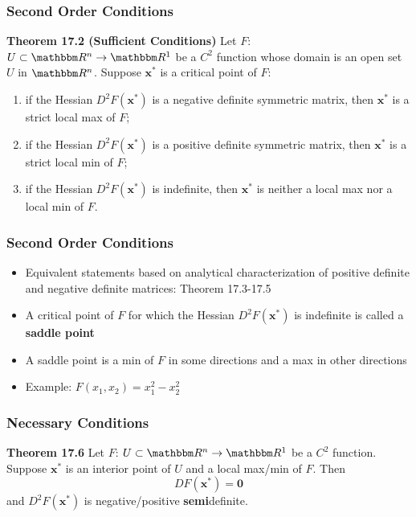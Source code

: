 \documentclass[9pt,aspectratio=169]{beamer}
\newcommand{\RR}{\mathbbm R}
\begin{document}
\begin{frame}
	\frametitle{Second Order Conditions}
	\begin{block}{\textbf{Theorem 17.2 (Sufficient Conditions)}}	
		Let $F$: $U\subset \RR^n \rightarrow \RR^1$ be a $C^2$ function whose
        domain is an open set $U$ in $\RR^n$. Suppose $\mathbf{x}^*$ is a
        critical point of $F$:
		\begin{enumerate}
            \item[(a)] if the Hessian $D^2F(\mathbf{x^*})$ is a negative
            definite symmetric matrix, then $\mathbf{x^*}$ is a strict local
            max of $F$;
            \item[(b)] if the Hessian $D^2F(\mathbf{x^*})$ is a positive
            definite symmetric matrix, then $\mathbf{x^*}$ is a strict local
            min of $F$;
            \item[(c)] if the Hessian $D^2F(\mathbf{x^*})$ is indefinite,
            then $\mathbf{x^*}$ is neither a local max nor a local min of
            $F$.
		\end{enumerate} 
	\end{block}
\end{frame}



\begin{frame}
	\frametitle{Second Order Conditions}
	\begin{itemize}%
        \item Equivalent statements based on analytical characterization of
        positive definite and negative definite matrices: Theorem 17.3-17.5
        \item A critical point of $F$ for which the Hessian
        $D^2F(\mathbf{x^*})$ is indefinite is called a \textbf{saddle point}
        \item A saddle point is a min of $F$ in some directions and a max in
        other directions
        \item Example: $F(x_1,x_2) = x_1^2-x_2^2$
	\end{itemize}
\end{frame}


\begin{frame}
	\frametitle{Necessary Conditions}
	\begin{block}{\textbf{Theorem 17.6}}	
		Let $F$: $U\subset \RR^n \rightarrow \RR^1$ be a $C^2$ function. Suppose $\mathbf{x}^*$ is an interior point of $U$ and a local max/min of $F$. Then  
		$$DF(\mathbf{x^*}) = \mathbf{0}$$ and $D^2F(\mathbf{x^*})$ is negative/positive \textbf{semi}definite. 
	\end{block}
\end{frame}
\end{document}
